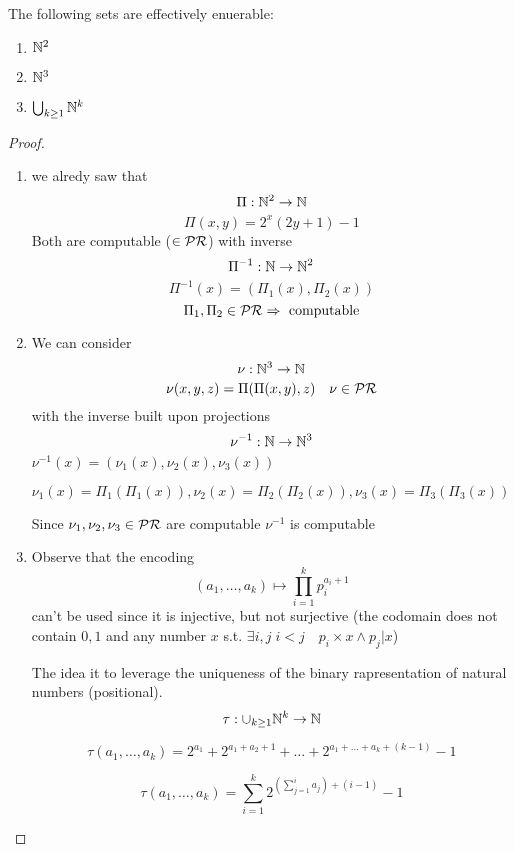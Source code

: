 \begin{lemma}
  The following sets are effectively enuerable:
  \begin{enumerate}[label=(\arabic*)]
  \item $ \mathbb{N}^2 $
  \item $ \mathbb{N}^3 $
  \item $\bigcup_{k\geq 1} \mathbb{N}^k $
  \end{enumerate}
  \begin{proof}
    \begin{enumerate}[label=(\arabic*)]
    \item we alredy saw that \[\Pi : \mathbb{N}^2 \rightarrow
        \mathbb{N}\] \[\Pi(x,y) = 2^x(2y+1)-1\] Both are computable
      ($\in \mathcal{PR}$) with inverse
      \[\Pi^{-1} : \mathbb{N} \rightarrow \mathbb{N}^2\]
      \[\Pi^{-1}(x) = (\Pi_1(x), \Pi_2(x))\]
      \[\Pi_1, \Pi_2 \in \mathcal{PR} \Rightarrow \text{ computable}\]
    \item{
        We can consider \[\nu : \mathbb{N}^3 \rightarrow
          \mathbb{N} \] \[\nu(x,y,z)= \Pi(\Pi(x,y),z) \quad \nu \in \mathcal{PR}\] with
        the inverse built upon projections
        \[\nu^{-1} : \mathbb{N} \rightarrow \mathbb{N}^3\]
        \(\nu^{-1}(x) = (\nu_1(x), \nu_2(x), \nu_3(x))\)

        \(\nu_1(x) = \Pi_1(\Pi_1(x)), \nu_2(x) = \Pi_2(\Pi_2(x)),
        \nu_3(x) = \Pi_3(\Pi_3(x))\)

        Since $\nu_1, \nu_2, \nu_3 \in \mathcal{PR}$ are computable $\nu^{-1}$
        is computable }
    \item{ Observe that the encoding
        \[(a_1, \dots, a_k) \mapsto \prod^k_{i=1}p_i^{a_i+1}\] can't
        be used since it is injective, but not surjective (the
        codomain does not contain $0,1$ and any number $x$
        s.t. \(\exists i,j \; i<j \quad p_i \times x \wedge p_j | x\))

        The idea it to leverage the uniqueness of the binary
        rapresentation of natural numbers (positional).
        \[\tau : \cup_{k \geq 1} \mathbb{N}^k \rightarrow \mathbb{N} \]
        
        \[\tau (a_1, \dots, a_k ) = 2^{a_1}+2^{a_1+a_2+1}+ \dots +
          2^{a_1+\dots + a_k + (k-1)} - 1\]
        
        \[\tau (a_1, \dots, a_k ) = \sum^k_{i=1}2^{(\sum_{j=1}^i a_j)
            + (i-1)}-1\]
        
}
\end{enumerate}
\end{proof}
\end{lemma}

